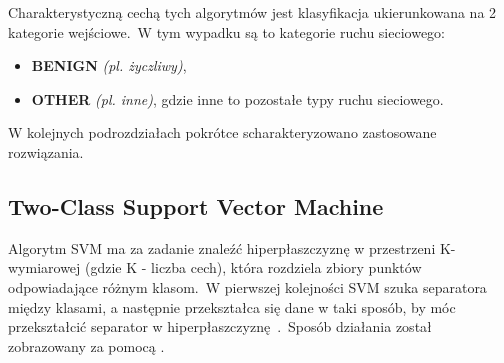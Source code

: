 Charakterystyczną cechą tych algorytmów jest klasyfikacja ukierunkowana na 2 kategorie wejściowe.\ W tym wypadku są to kategorie ruchu sieciowego:
\begin{itemize}
    \item \textbf{BENIGN} \textit{(pl. życzliwy)},
    \item \textbf{OTHER} \textit{(pl. inne)}, gdzie inne to pozostałe typy ruchu sieciowego.
\end{itemize}

W kolejnych podrozdziałach pokrótce scharakteryzowano zastosowane rozwiązania.

\subsection{Two-Class Support Vector Machine}\label{subsec:svm}
Algorytm SVM ma za zadanie znaleźć hiperpłaszczyznę w przestrzeni K-wymiarowej (gdzie K - liczba cech), która rozdziela zbiory punktów odpowiadające różnym klasom.\ W pierwszej kolejności SVM szuka separatora między klasami, a następnie przekształca się dane w taki sposób, by móc przekształcić separator w hiperpłaszczyznę~\cite{IBM}.\ Sposób działania został zobrazowany za pomocą .

